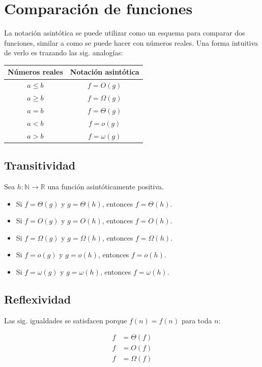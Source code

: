 \section{Comparación de funciones}

La notación asintótica se puede utilizar como un esquema para comparar
dos funciones, similar a como se puede hacer con números reales. Una
forma intuitiva de verlo es trazando las sig. analogías:

\begin{center}
\begin{tabular}{cc}
    \toprule 
        Números reales & Notación asintótica\tabularnewline
    \midrule
        $a\leq b$ & $f=O(g)$\tabularnewline
        $a\ge b$ & $f=\Omega(g)$\tabularnewline
        $a=b$ & $f=\Theta(g)$\tabularnewline
        $a<b$ & $f=o(g)$\tabularnewline
        $a>b$ & $f=\omega(g)$\tabularnewline
    \bottomrule
\end{tabular}
\par\end{center}

\subsection{Transitividad}

Sea $h:\mathbb{N}\to\mathbb{R}$ una función asintóticamente positiva. 

\begin{itemize}
    \item Si $f=\Theta(g)$ y $g=\Theta(h)$, entonces $f=\Theta(h)$.
    \item Si $f=O(g)$ y $g=O(h)$, entonces $f=O(h)$. 
    \item Si $f=\Omega(g)$ y $g=\Omega(h)$, entonces $f=\Omega(h)$.
    \item Si $f=o(g)$ y $g=o(h)$, entonces $f=o(h)$.
    \item Si $f=\omega(g)$ y $g=\omega(h)$, entonces $f=\omega(h)$.
\end{itemize}

\subsection{Reflexividad}

Las sig. igualdades se satisfacen porque $f(n)=f(n)$ para toda $n$:

\[
    \begin{aligned}
        f &= \Theta(f)\\
        f &= O(f)\\
        f &= \Omega(f)
    \end{aligned}
\]


